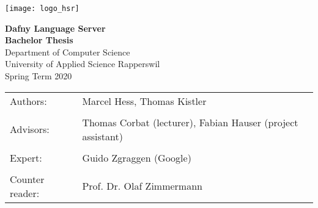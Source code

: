 \begin{titlepage}
\thispagestyle{empty}

\newcommand\thesisAuthors{Marcel Hess, Thomas Kistler}
\newcommand\thesisTitle{Dafny Language Server}
\newcommand\thesisSubject{Bachelor Thesis}
\newcommand\thesisUniversity{University of Applied Science Rapperswil}
\newcommand\thesisDepartment{Department of Computer Science}
\newcommand\thesisAdvisors{Thomas Corbat (lecturer), Fabian Hauser (project assistant)}
\newcommand\thesisExpert{Guido Zgraggen (Google)}
\newcommand\thesisPeriod{Spring Term 2020}
\newcommand\thesisReader{Prof. Dr. Olaf Zimmermann}

    \texttt{[image: logo\_hsr]}\\[40mm]

    \begin{center}

    	\Huge
    	\textbf{\thesisTitle} \\
    	\textbf{\thesisSubject} \\[20mm]

    	\LARGE
    	\thesisDepartment\\
    	\thesisUniversity\\[10mm]

    	\thesisPeriod \\[15mm]

    	\vfill

    \end{center}

\begin{tabularx}{\textwidth}{l X}
			\large Authors: & \large{ \thesisAuthors} \tabularnewline
			\tabularnewline
			\large Advisors: & \large{\thesisAdvisors} \tabularnewline
			\tabularnewline
			\large Expert: & \large \thesisExpert \tabularnewline
			\tabularnewline
			\large Counter reader: & \large \thesisReader
		\end{tabularx}

\end{titlepage}
